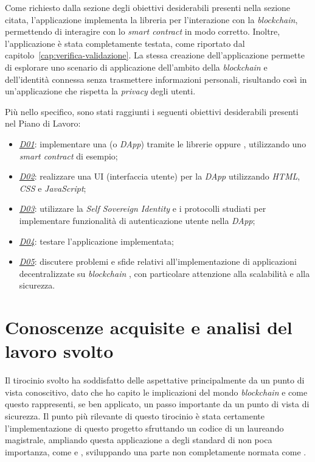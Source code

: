 Come richiesto dalla sezione degli obiettivi desiderabili presenti nella sezione citata, l'applicazione implementa la libreria 
 per l'interazione con la \textit{blockchain}, permettendo di interagire con lo \textit{smart contract} in modo corretto.
Inoltre, l'applicazione è stata completamente testata, come riportato dal capitolo~\ref{cap:verifica-validazione}. 
La stessa creazione dell'applicazione permette di esplorare uno scenario di applicazione dell'ambito della \textit{blockchain} e dell'identità connessa
senza trasmettere informazioni personali, risultando così in un'applicazione che rispetta la \textit{privacy} degli utenti.

Più nello specifico, sono stati raggiunti i seguenti obiettivi desiderabili presenti nel Piano di Lavoro:
\begin{itemize}
    \item \underline{\textit{D01}}: implementare una  (o \textit{DApp}) tramite le librerie  oppure , utilizzando uno \textit{smart contract} di esempio;
    \item \underline{\textit{D02}}: realizzare una UI (interfaccia utente) per la \textit{DApp} utilizzando \textit{HTML}, \textit{CSS} e \textit{JavaScript};
    \item \underline{\textit{D03}}: utilizzare la \textit{Self Sovereign Identity} e i protocolli studiati per implementare funzionalità di autenticazione utente nella \textit{DApp};
    \item \underline{\textit{D04}}: testare l'applicazione implementata;
    \item \underline{\textit{D05}}: discutere problemi e sfide relativi all'implementazione di applicazioni decentralizzate su \textit{blockchain} , con particolare attenzione alla scalabilità e alla sicurezza.
\end{itemize}

\section{Conoscenze acquisite e analisi del lavoro svolto}\label{sec:conclusioni-conoscenze-lavoro}

Il tirocinio svolto ha soddisfatto delle aspettative principalmente da un punto di vista conoscitivo, dato che ho capito le implicazioni del mondo \textit{blockchain} e come questo rappresenti,
se ben applicato, un passo importante da un punto di vista di sicurezza. 
Il punto più rilevante di questo tirocinio è stata certamente l'implementazione di questo progetto sfruttando un codice di un laureando magistrale, ampliando questa applicazione a degli standard 
di non poca importanza, come  e , sviluppando una parte non completamente normata come . \\

